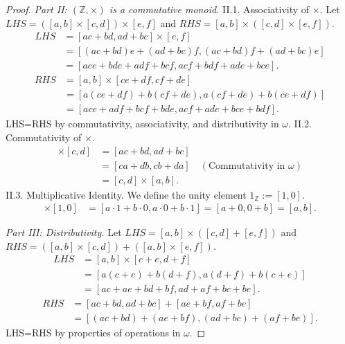 \documentclass[11pt, a4paper]{article}
\theoremstyle{plain}
\theoremstyle{definition}
\numberwithin{equation}{section}
\newcommand{\Z}{\mathbb{Z}}
\begin{document}
\begin{proof}
\emph{Part II: $(\Z, \times)$ is a commutative monoid.}
II.1. Associativity of $\times$.
Let $LHS = ([a, b] \times [c, d]) \times [e, f]$ and $RHS = [a, b] \times ([c, d] \times [e, f])$.
\begin{align*}
    LHS &= [ac+bd, ad+bc] \times [e, f] \\
    &= [(ac+bd)e+(ad+bc)f, (ac+bd)f+(ad+bc)e] \\
    &= [ace+bde+adf+bcf, acf+bdf+ade+bce].
\end{align*}
\begin{align*}
    RHS &= [a, b] \times [ce+df, cf+de] \\
    &= [a(ce+df)+b(cf+de), a(cf+de)+b(ce+df)] \\
    &= [ace+adf+bcf+bde, acf+ade+bce+bdf].
\end{align*}
LHS=RHS by commutativity, associativity, and distributivity in $\omega$.
II.2. Commutativity of $\times$.
\begin{align*}
    [a, b] \times [c, d] &= [ac+bd, ad+bc] \\
    &= [ca+db, cb+da] \quad (\text{Commutativity in } \omega) \\
    &= [c, d] \times [a, b].
\end{align*}
II.3. Multiplicative Identity. We define the unity element $1_{\Z} := [1, 0]$.
\begin{align*}
    [a, b] \times [1, 0] &= [a\cdot 1+b\cdot 0, a\cdot 0+b\cdot 1] = [a+0, 0+b] = [a, b].
\end{align*}

\emph{Part III: Distributivity.}
Let $LHS = [a, b] \times ([c, d] + [e, f])$ and $RHS = ([a, b] \times [c, d]) + ([a, b] \times [e, f])$.
\begin{align*}
    LHS &= [a, b] \times [c+e, d+f] \\
    &= [a(c+e)+b(d+f), a(d+f)+b(c+e)] \\
    &= [ac+ae+bd+bf, ad+af+bc+be].
\end{align*}
\begin{align*}
    RHS &= [ac+bd, ad+bc] + [ae+bf, af+be] \\
    &= [(ac+bd)+(ae+bf), (ad+bc)+(af+be)].
\end{align*}
LHS=RHS by properties of operations in $\omega$.


\end{proof}
\end{document}

